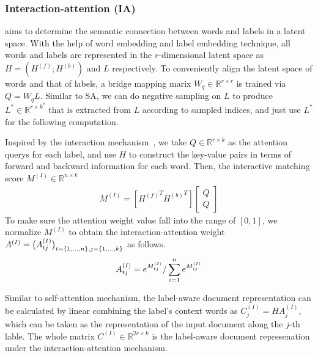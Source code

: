 \documentclass[runningheads]{llncs}
\newenvironment{sequation}{\begin{equation}\small}{\end{equation}}
\begin{document}
\subsubsection{Interaction-attention (IA)} aims to determine the semantic connection between words and labels in a latent space. With the help of word embedding and label embedding technique, all words and labels are represented in the $r$-dimensional latent space as $H=(H^{ (f) };H^{ (b) })$ and $L$ respectively. To conveniently align the latent space of words and that of labels, a bridge mapping marix $W_q \in \mathbb{R}^{r\times r}$ is trained via $Q={ W }_{ q}{L}$. Similar to SA, we can do negative sampling on $L$ to produce $L^{*}\in{\mathbb{R} }^{ r\times { k^{ * } }}$ that is extracted from $L$ according to sampled indices, and just use $L^{*}$ for the following computation.


 Inspired by the interaction mechanism~\cite{ref_article8}, we take $Q\in \mathbb{R}^{r\times k}$ as the attention querys for each label, and use $H$ to construct the key-value pairs in terms of forward and backward information for each word. Then, the interactive matching score ${M}^{(I)}\in \mathbb{R}^{n\times k}$
 \begin{gather}
{ M }^{ (I) }=\left[ { { H }^{ (f) } }^{ T }{  { H }^{ (b) } }^{ T } \right] \left[ \begin{matrix} Q \\ Q \end{matrix} \right] 
 \end{gather}
 To make sure the attention weight value fall into the range of $[0,1]$, we normalize $M^{(I)}$ to obtain the interaction-attention weight $A^{(I)} = \big ({A}^{(I)}_{tj} \big )_{t=\{1,...,n\},\\j=\{1,...,k\}}$ as follows.
\begin{sequation}
{A}^{(I)}_{tj} =e^{{M}^{(I)}_{tj}}/\sum_{ i=1 }^{n} e^{{M}^{(I)}_{ij}}
\end{sequation}


Similar to self-attention mechanism, the label-aware document representation can be calculated by linear combining the label's context words as ${C}^{(I)}_j=H A^{(I)}_j$,
which can be taken as the representation of the input document along the $j$-th lable. The whole matrix $C^{(I)}\in \mathbb{R}^{2r\times k}$ is the label-aware document represenation under the interaction-attention mechanism.

\vspace{-2mm}
\end{document}
